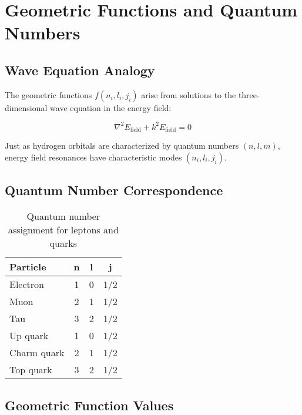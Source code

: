 \documentclass[12pt,a4paper]{article}
\newcommand{\Efield}{E_{\text{field}}}
\begin{document}
	\section{Geometric Functions and Quantum Numbers}
	\label{sec:geometric_functions}
	
	\subsection{Wave Equation Analogy}
	\label{subsec:wave_equation_analogy}
	
	The geometric functions $f(n_i, l_i, j_i)$ arise from solutions to the three-dimensional wave equation in the energy field:
	
	\begin{equation}
		\nabla^2 \Efield + k^2 \Efield = 0
	\end{equation}
	
	Just as hydrogen orbitals are characterized by quantum numbers $(n, l, m)$, energy field resonances have characteristic modes $(n_i, l_i, j_i)$.
	
	\subsection{Quantum Number Correspondence}
	\label{subsec:quantum_number_correspondence}
	
	\begin{table}[htbp]
		\centering
		\begin{tabular}{lccc}
			\toprule
			\textbf{Particle} & \textbf{n} & \textbf{l} & \textbf{j} \\
			\midrule
			Electron & 1 & 0 & 1/2 \\
			Muon & 2 & 1 & 1/2 \\
			Tau & 3 & 2 & 1/2 \\
			\midrule
			Up quark & 1 & 0 & 1/2 \\
			Charm quark & 2 & 1 & 1/2 \\
			Top quark & 3 & 2 & 1/2 \\
			\bottomrule
		\end{tabular}
		\caption{Quantum number assignment for leptons and quarks}
		\label{tab:quantum_numbers}
	\end{table}
	
	\subsection{Geometric Function Values}
	\label{subsec:geometric_function_values}
	
\end{document}
